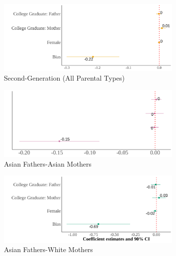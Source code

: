 \begin{center}
\begin{figure}[!htb]
\centering
\caption{Relationship Between Self-Reported Asian Identity and Bias: By Parental Types at the MSA Level}
\label{plot01-regression-byparent-msa}
\begin{subfigure}{.48\textwidth}
\caption{Second-Generation (All Parental Types)}
\centering
\includegraphics[width=.9\linewidth]{county-by-parents-regs-all.png}
\end{subfigure}
\centering
\begin{subfigure}{.48\textwidth}
\caption{Asian Fathers-Asian Mothers}
\centering
\includegraphics[width=.9\linewidth]{county-by-parents-regs-hh.png}
\end{subfigure}
\begin{subfigure}{.48\textwidth}
\caption{Asian Fathers-White Mothers}
\centering
\includegraphics[width=.9\linewidth]{county-by-parents-regs-hw.png}
\end{subfigure}
\begin{subfigure}{.48\textwidth}

\end{subfigure}
\end{figure}
\end{center}
